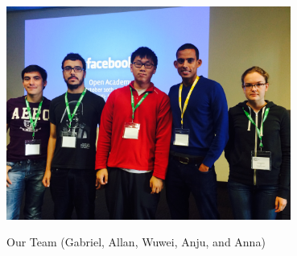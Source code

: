 \begin{frame}

\begin{center}
\includegraphics[width=0.7\textwidth]{figs/team.jpg}
\end{center}

\begin{center}
Our Team (Gabriel, Allan, Wuwei, Anju, and Anna)
\end{center}

\end{frame}
